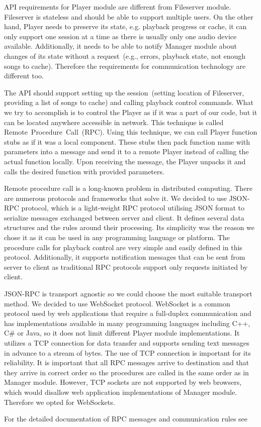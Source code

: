 API requirements for Player module are different from Fileserver module. Fileserver is stateless and should be able to support multiple users. On the other hand, Player needs to preserve its state, e.g. playback progress or cache, it can only support one session at a time as there is usually only one audio device available. Additionally, it needs to be able to notify Manager module about changes of its state without a request~(e.g., errors, playback state, not enough songs to cache). Therefore the requirements for communication technology are different too.
\par
The API should support setting up the session~(setting location of Fileserver, providing a list of songs to cache) and calling playback control commands. What we try to accomplish is to control the Player as if it was a part of our code, but it can be located anywhere accessible in network. This technique is called Remote~Procedure~Call~(RPC). Using this technique, we can call Player function stubs as if it was a local component. These stubs then pack function name with parameters into a message and send it to a remote Player instead of calling the actual function locally. Upon receiving the message, the Player unpacks it and calls the desired function with provided parameters.
\par
Remote procedure call is a long-known problem in distributed computing. There are numerous protocols and frameworks that solve it. We decided to use JSON-RPC protocol, which is a light-weight RPC protocol utilising JSON format to serialize messages exchanged between server and client. It defines several data structures and the rules around their processing. Its simplicity was the reason we chose it as it can be used in any programming language or platform. The procedure calls for playback control are very simple and easily defined in this protocol. Additionally, it supports notification messages that can be sent from server to client as traditional RPC protocols support only requests initiated by client.
\par
JSON-RPC is transport agnostic so we could choose the most suitable transport method. We decided to use WebSocket protocol. WebSocket is a common protocol used by web applications that require a full-duplex communication and has implementations available in many programming languages including C++, C\# or Java, so it does not limit different Player module implementations. It utilizes a TCP connection for data transfer and supports sending text messages in advance to a stream of bytes. The use of TCP connection is important for its reliability. It is important that all RPC messages arrive to destination and that they arrive in correct order so the procedures are called in the same order as in Manager module. However, TCP sockets are not supported by web browsers, which would disallow web application implementations of Manager module. Therefore we opted for WebSockets.
\par
For the detailed documentation of RPC messages and communication rules see 

